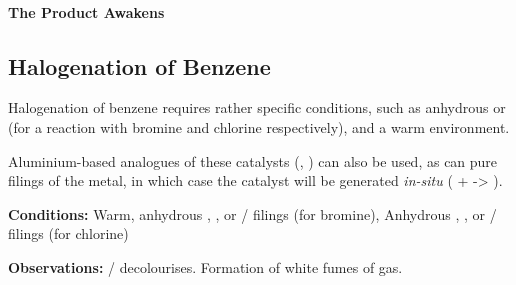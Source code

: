 			\paragraph{The Product Awakens}
















			\pagebreak
			\subsection{Halogenation of Benzene}

				Halogenation of benzene requires rather specific conditions, such as anhydrous  or  (for a reaction
				with bromine and chlorine respectively), and a warm environment.

				Aluminium-based analogues of these catalysts (, ) can also be used, as can pure
				filings of the metal, in which case the catalyst will be generated \textit{in-situ} ( +  -> ).


				\vspace{1.5em}
				\vbox{\textbf{Conditions:}	\tabto{35mm}Warm, anhydrous , , or  / \ch{\aluminium} filings (for bromine),
											\tabto{35mm}Anhydrous , , or
														 / \ch{\aluminium} filings (for chlorine)}

				\vspace{0.75em}
				\vbox{\textbf{Observations:}\tabto{35mm}  /   decolourises.
											\tabto{35mm}Formation of white fumes of  gas.}



